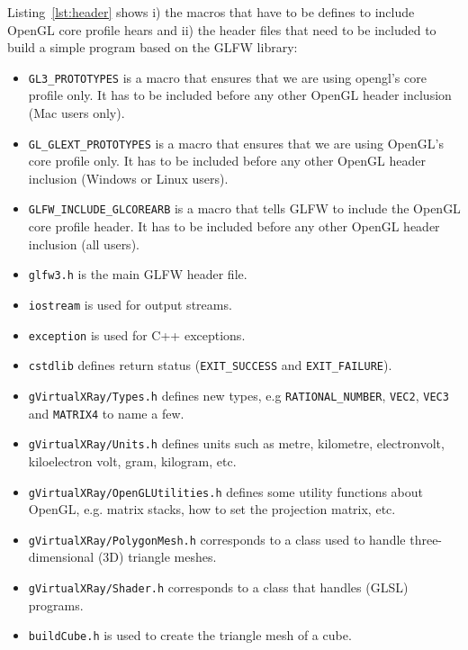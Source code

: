 \documentclass[11pt,oneside,a4paper,final]{article}
\begin{document}
Listing~\ref{lst:header} shows i) the macros that have to be defines to include 
OpenGL core profile hears and ii) the header files that need to be included to 
build a simple program based on the GLFW 
library:
\begin{itemize}
 \item \verb+GL3_PROTOTYPES+ is a macro that ensures that we are using opengl's 
core profile only. It has to be included before any other OpenGL header 
inclusion (Mac users only).
 \item \verb+GL_GLEXT_PROTOTYPES+ is a macro that ensures that we are using 
OpenGL's core profile only. It has to be included before any other OpenGL header 
inclusion (Windows or Linux users).
 \item \verb+GLFW_INCLUDE_GLCOREARB+ is a macro that tells GLFW to include the 
OpenGL core profile header. It has to be included before any other OpenGL header 
inclusion (all users).
 \item \verb+glfw3.h+ is the main GLFW header file.
 \item \verb+iostream+ is used for output streams.
 \item \verb+exception+ is used for C++ exceptions.
 \item \verb+cstdlib+ defines return status (\verb+EXIT_SUCCESS+ and 
	\verb+EXIT_FAILURE+).
 \item \verb+gVirtualXRay/Types.h+ defines new types, e.g 
\verb+RATIONAL_NUMBER+, 
	\verb+VEC2+, \verb+VEC3+ and \verb+MATRIX4+ to name a few.
 \item \verb+gVirtualXRay/Units.h+ defines units such as metre, kilometre, 
electronvolt, 
	kiloelectron volt, gram, kilogram, etc.
 \item \verb+gVirtualXRay/OpenGLUtilities.h+ defines some utility functions 
about OpenGL, 
	e.g. matrix stacks, how to set the projection matrix, etc.
 \item \verb+gVirtualXRay/PolygonMesh.h+ corresponds to a class used to handle 
three-dimensional (3D) triangle meshes.
 \item \verb+gVirtualXRay/Shader.h+ corresponds to a class that handles 
(GLSL) programs.
 \item \verb+buildCube.h+ is used to create the triangle mesh of a cube.
\end{itemize}

\begin{center}

\end{center}
\end{document}
